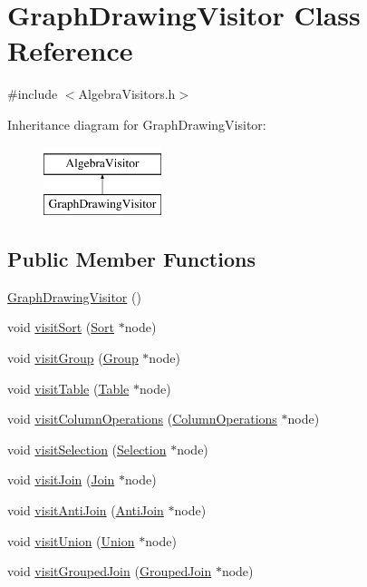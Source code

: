 \hypertarget{class_graph_drawing_visitor}{\section{Graph\+Drawing\+Visitor Class Reference}
\label{class_graph_drawing_visitor}
}


{\ttfamily \#include $<$Algebra\+Visitors.\+h$>$}

Inheritance diagram for Graph\+Drawing\+Visitor\+:\begin{figure}[H]
\begin{center}
\leavevmode
\includegraphics[height=2.000000cm]{class_graph_drawing_visitor}
\end{center}
\end{figure}
\subsection*{Public Member Functions}
\begin{DoxyCompactItemize}
\item 
\hyperlink{class_graph_drawing_visitor_a9d02755cb6c2b10984a573a28751ed8a}{Graph\+Drawing\+Visitor} ()
\item 
void \hyperlink{class_graph_drawing_visitor_aae222309bf242fc78da5add861cfde20}{visit\+Sort} (\hyperlink{class_sort}{Sort} $\ast$node)
\item 
void \hyperlink{class_graph_drawing_visitor_aabe646e1bc301a127722a54568479653}{visit\+Group} (\hyperlink{class_group}{Group} $\ast$node)
\item 
void \hyperlink{class_graph_drawing_visitor_a396774ef87bd463ac1a588fef83b885a}{visit\+Table} (\hyperlink{class_table}{Table} $\ast$node)
\item 
void \hyperlink{class_graph_drawing_visitor_a8cc0865d330a29411e83261205382eeb}{visit\+Column\+Operations} (\hyperlink{class_column_operations}{Column\+Operations} $\ast$node)
\item 
void \hyperlink{class_graph_drawing_visitor_a8c533a1dc5b55e26608615ff392e384b}{visit\+Selection} (\hyperlink{class_selection}{Selection} $\ast$node)
\item 
void \hyperlink{class_graph_drawing_visitor_a77fbec744cd6a2ac39e22120114c7edd}{visit\+Join} (\hyperlink{class_join}{Join} $\ast$node)
\item 
void \hyperlink{class_graph_drawing_visitor_ae25e72a771d8ec5949caa0a92a1e61aa}{visit\+Anti\+Join} (\hyperlink{class_anti_join}{Anti\+Join} $\ast$node)
\item 
void \hyperlink{class_graph_drawing_visitor_af0a1bb8a0ba7f47a89a8ae01288af625}{visit\+Union} (\hyperlink{class_union}{Union} $\ast$node)
\item 
void \hyperlink{class_graph_drawing_visitor_a4d92f0106ac1d8035498c8b5e1490919}{visit\+Grouped\+Join} (\hyperlink{class_grouped_join}{Grouped\+Join} $\ast$node)
\end{DoxyCompactItemize}
